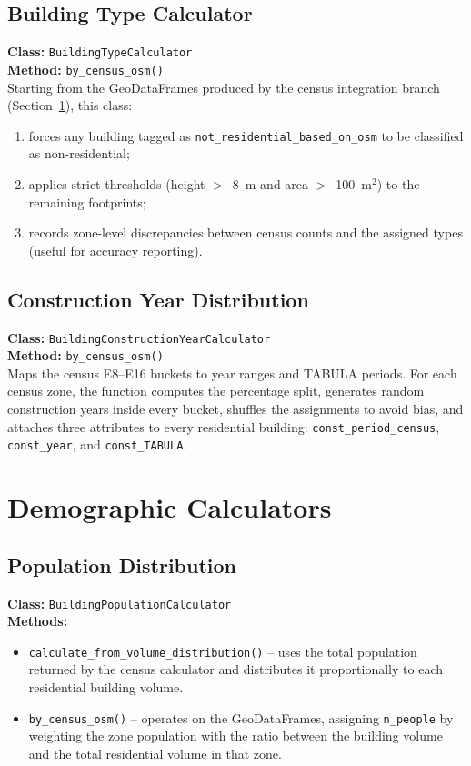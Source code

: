 \subsection{Building Type Calculator}
\textbf{Class:} \texttt{BuildingTypeCalculator}\\
\textbf{Method:} \texttt{by\_census\_osm()}\\
Starting from the GeoDataFrames produced by the census integration
branch (Section~\ref{sec:demographics}), this class:
\begin{enumerate}[label=\roman*),leftmargin=2em]
    \item forces any building tagged as \texttt{not\_residential\_based\_on\_osm} to be classified as non-residential;
    \item applies strict thresholds (height $>$~8~m and area $>$~100~m$^2$) to
    the remaining footprints;
    \item records zone-level discrepancies between census counts and the
    assigned types (useful for accuracy reporting).
\end{enumerate}

\subsection{Construction Year Distribution}
\textbf{Class:} \texttt{BuildingConstructionYearCalculator}\\
\textbf{Method:} \texttt{by\_census\_osm()}\\
Maps the census E8--E16 buckets to year ranges and TABULA periods. For
each census zone, the function computes the percentage split,
generates random construction years inside every bucket, shuffles the
assignments to avoid bias, and attaches three attributes to every
residential building: \texttt{const\_period\_census},
\texttt{const\_year}, and \texttt{const\_TABULA}.

\section{Demographic Calculators}
\label{sec:demographics}
\subsection{Population Distribution}
\textbf{Class:} \texttt{BuildingPopulationCalculator}\\
\textbf{Methods:}
\begin{itemize}[leftmargin=2em]
    \item \texttt{calculate\_from\_volume\_distribution()} – uses the total
    population returned by the census calculator and distributes it
    proportionally to each residential building volume.
    \item \texttt{by\_census\_osm()} – operates on the GeoDataFrames,
    assigning \texttt{n\_people} by weighting the zone population with
    the ratio between the building volume and the total residential
    volume in that zone.
\end{itemize}

